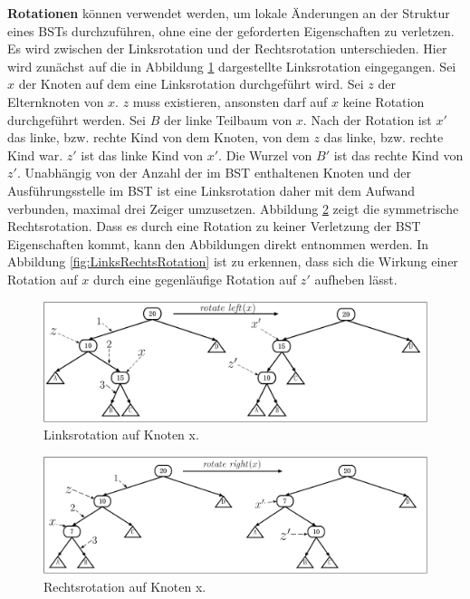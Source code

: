 \documentclass[a4paper,12pt]{article}
\begin{document}
\noindent\textbf{Rotationen} können verwendet werden, um lokale Änderungen an der Struktur eines BSTs durchzuführen, ohne eine der geforderten Eigenschaften zu verletzen. Es wird zwischen der Linksrotation und der Rechtsrotation 
unterschieden. Hier wird zunächst auf die in Abbildung \ref{fig:Linksrotation} dargestellte Linksrotation eingegangen. 
Sei $x$ der Knoten auf dem eine Linksrotation durchgeführt wird. Sei $z$ der Elternknoten von $x$. $z$ muss existieren, ansonsten darf auf $x$ keine Rotation durchgeführt werden. Sei $B$ der linke Teilbaum von $x$. Nach der Rotation ist $x'$ das linke, bzw. rechte Kind von dem Knoten, von dem $z$ das linke, bzw. rechte Kind war. $z'$ ist das linke Kind von $x'$. Die Wurzel von $B '$ ist das rechte Kind von $z'$. Unabhängig von der Anzahl der im BST enthaltenen Knoten und der Ausführungsstelle im BST ist eine Linksrotation daher mit dem Aufwand verbunden, maximal drei Zeiger umzusetzen. Abbildung \ref{fig:Rechtsrotation} zeigt die symmetrische Rechtsrotation. Dass es durch eine Rotation zu keiner Verletzung der BST Eigenschaften kommt, kann den Abbildungen direkt entnommen werden. In Abbildung \ref{fig:LinksRechtsRotation} ist zu erkennen, dass sich die Wirkung einer Rotation auf $x$ durch eine gegenläufige Rotation auf $z'$ aufheben lässt.  
\begin{figure}[H]
	\centering
	\includegraphics[width= 1\textwidth]{Medien/Einleitung/Linksrotation}
	\caption{Linksrotation auf Knoten x. }
	\label{fig:Linksrotation}
\end{figure}
\begin{figure}[H]
	\centering
	\includegraphics[width= 1\textwidth]{Medien/Einleitung/Rechtsrotation}
	\caption{Rechtsrotation auf Knoten x. }
	\label{fig:Rechtsrotation}
\end{figure}
\end{document}
